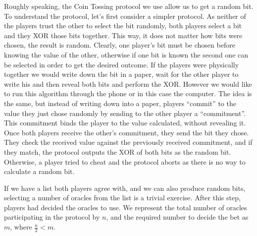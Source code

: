 Roughly speaking, the Coin Tossing protocol we use allow us to get a random bit.
To understand the protocol, let's first consider a simpler protocol.
As neither of the players trust the other to select the bit randomly, both
  players select a bit and they XOR those bits together.
This way, it does not matter how bits were chosen, the result is random.
Clearly, one player's bit must be chosen before knowing the value of  the other,
  otherwise if one bit is known the second one can be selected in order to get
  the desired outcome.
If the players were physically together we would write down the bit in a paper,
  wait for the other player to write his and then reveal both bits and perform
  the XOR\@.
However we would like to run this algorithm through the phone or in this case
  the computer.
The idea is the same, but instead of writing down into a paper, players
  ``commit'' to the value they just chose randomly by sending to the other
  player a ``commitment''.
This commitment binds the player to the value calculated, without revealing it.
Once both players receive the other's commitment, they send the bit they chose.
They check the received value against the previously received commitment, and if
  they match, the protocol outputs the XOR of both bits as the random bit.
Otherwise, a player tried to cheat and the protocol aborts as there is no way to
  calculate a random bit.

If we have a list both players agree with, and we can also produce random bits,
  selecting a number of oracles from the list is a trivial exercise.
After this step, players had decided the oracles to use.
We represent the total number of oracles participating in the protocol by $n$,
  and the required number to decide the bet as $m$, where $\frac{n}{2} < m$.
